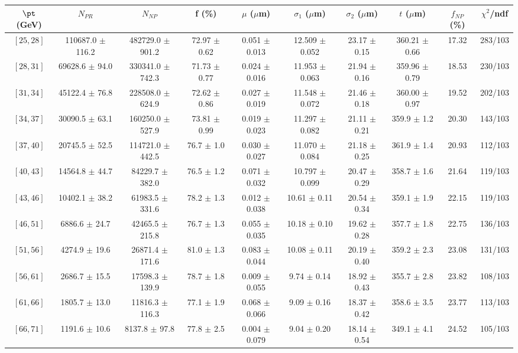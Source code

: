 \begin{tabular}{c||c|c|c|c|c|c|c||c|c}
$\pt$ (GeV) & $N_{PR}$ & $N_{NP}$ & f (\%) & $\mu$ ($\mu$m) & $\sigma_1$ ($\mu$m) & $\sigma_2$ ($\mu$m)  & $t$ ($\mu$m) & $f_{NP}$ (\%) & $\chi^2$/ndf \\
\hline
$[25, 28]$ & 110687.0 $\pm$ 116.2 & 482729.0 $\pm$ 901.2 & 72.97 $\pm$ 0.62 & 0.051 $\pm$ 0.013 & 12.509 $\pm$ 0.052 & 23.17 $\pm$ 0.15 & 360.21 $\pm$ 0.66 & 17.32 & 283/103\\
$[28, 31]$ & 69628.6 $\pm$ 94.0 & 330341.0 $\pm$ 742.3 & 71.73 $\pm$ 0.77 & 0.024 $\pm$ 0.016 & 11.953 $\pm$ 0.063 & 21.94 $\pm$ 0.16 & 359.96 $\pm$ 0.79 & 18.53 & 230/103\\
$[31, 34]$ & 45122.4 $\pm$ 76.8 & 228508.0 $\pm$ 624.9 & 72.62 $\pm$ 0.86 & 0.027 $\pm$ 0.019 & 11.548 $\pm$ 0.072 & 21.46 $\pm$ 0.18 & 360.00 $\pm$ 0.97 & 19.52 & 202/103\\
$[34, 37]$ & 30090.5 $\pm$ 63.1 & 160250.0 $\pm$ 527.9 & 73.81 $\pm$ 0.99 & 0.019 $\pm$ 0.023 & 11.297 $\pm$ 0.082 & 21.11 $\pm$ 0.21 & 359.9 $\pm$ 1.2 & 20.30 & 143/103\\
$[37, 40]$ & 20745.5 $\pm$ 52.5 & 114721.0 $\pm$ 442.5 & 76.7 $\pm$ 1.0 & 0.030 $\pm$ 0.027 & 11.070 $\pm$ 0.084 & 21.18 $\pm$ 0.25 & 361.9 $\pm$ 1.4 & 20.93 & 112/103\\
$[40, 43]$ & 14564.8 $\pm$ 44.7 & 84229.7 $\pm$ 382.0 & 76.5 $\pm$ 1.2 & 0.071 $\pm$ 0.032 & 10.797 $\pm$ 0.099 & 20.47 $\pm$ 0.29 & 358.7 $\pm$ 1.6 & 21.64 & 119/103\\
$[43, 46]$ & 10402.1 $\pm$ 38.2 & 61983.5 $\pm$ 331.6 & 78.2 $\pm$ 1.3 & 0.012 $\pm$ 0.038 & 10.61 $\pm$ 0.11 & 20.54 $\pm$ 0.34 & 359.1 $\pm$ 1.9 & 22.15 & 119/103\\
$[46, 51]$ & 6886.6 $\pm$ 24.7 & 42465.5 $\pm$ 215.8 & 76.7 $\pm$ 1.3 & 0.055 $\pm$ 0.035 & 10.18 $\pm$ 0.10 & 19.62 $\pm$ 0.28 & 357.7 $\pm$ 1.8 & 22.75 & 136/103\\
$[51, 56]$ & 4274.9 $\pm$ 19.6 & 26871.4 $\pm$ 171.6 & 81.0 $\pm$ 1.3 & 0.083 $\pm$ 0.044 & 10.08 $\pm$ 0.11 & 20.19 $\pm$ 0.40 & 359.2 $\pm$ 2.3 & 23.08 & 131/103\\
$[56, 61]$ & 2686.7 $\pm$ 15.5 & 17598.3 $\pm$ 139.9 & 78.7 $\pm$ 1.8 & 0.009 $\pm$ 0.055 & 9.74 $\pm$ 0.14 & 18.92 $\pm$ 0.43 & 355.7 $\pm$ 2.8 & 23.82 & 108/103\\
$[61, 66]$ & 1805.7 $\pm$ 13.0 & 11816.3 $\pm$ 116.3 & 77.1 $\pm$ 1.9 & 0.068 $\pm$ 0.066 & 9.09 $\pm$ 0.16 & 18.37 $\pm$ 0.42 & 358.6 $\pm$ 3.5 & 23.77 & 113/103\\
$[66, 71]$ & 1191.6 $\pm$ 10.6 & 8137.8 $\pm$ 97.8 & 77.8 $\pm$ 2.5 & 0.004 $\pm$ 0.079 & 9.04 $\pm$ 0.20 & 18.14 $\pm$ 0.54 & 349.1 $\pm$ 4.1 & 24.52 & 105/103\\

\end{tabular}

